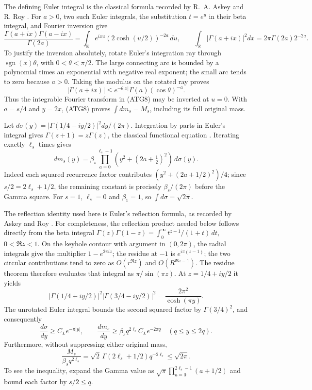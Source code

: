 \documentclass[11pt,a4paper]{article}
\begin{document}
The defining Euler integral is the classical formula recorded by
R.~A. Askey and R. Roy \cite[eq.~(5.2.1)]{human:dlmf5}.
For $a>0$, two such Euler integrals, the substitution $t=e^u$ in their
beta integral, and Fourier inversion give
\[
 \frac{\Gamma(a+ix)\Gamma(a-ix)}{\Gamma(2a)}
 =\int_{\mathbb R}e^{ixu}(2\cosh(u/2))^{-2a}\,du,
 \qquad
 \int_{\mathbb R}|\Gamma(a+ix)|^2dx
 =2\pi\Gamma(2a)2^{-2a}.
\tag{ATG8}
\]
To justify the inversion absolutely, rotate Euler's integration ray
through $\operatorname{sgn}(x)\theta$, with $0<\theta<\pi/2$.
The large connecting arc is bounded by a polynomial times an
exponential with negative real exponent; the small arc tends to zero
because $a>0$. Taking the modulus on the rotated ray proves
\[
 |\Gamma(a+ix)|\le e^{-\theta|x|}\Gamma(a)(\cos\theta)^{-a}.
\tag{ATG9}
\]
Thus the integrable Fourier transform in (ATG8) may be inverted at
$u=0$. With $a=s/4$ and $y=2x$, (ATG8) proves
$\int dm_s=M_s$, including its full original mass.

Let
$d\sigma(y)=|\Gamma(1/4+iy/2)|^2dy/(2\pi)$.
Integration by parts in Euler's integral gives
$\Gamma(z+1)=z\Gamma(z)$, the classical functional equation
\cite[eq.~(5.5.1)]{human:dlmf5}. Iterating exactly $\ell_s$ times gives
\[
 dm_s(y)=\beta_s\prod_{a=0}^{\ell_s-1}
                (y^2+(2a+\tfrac12)^2)\,d\sigma(y).
\tag{ATG10}
\]
Indeed each squared recurrence factor contributes
$(y^2+(2a+1/2)^2)/4$; since $s/2=2\ell_s+1/2$, the remaining
constant is precisely $\beta_s/(2\pi)$ before the Gamma square.
For $s=1$, $\ell_s=0$ and $\beta_1=1$, so
$\int d\sigma=\sqrt{2\pi}$.

The reflection identity used here is Euler's reflection formula,
as recorded by Askey and Roy \cite[eq.~(5.5.3)]{human:dlmf5}.
For completeness, the reflection product needed below follows
directly from the beta integral
$\Gamma(z)\Gamma(1-z)=\int_0^\infty t^{z-1}/(1+t)\,dt$,
$0<\Re z<1$. On the keyhole contour with argument in $(0,2\pi)$,
the radial integrals give the multiplier $1-e^{2\pi iz}$; the
residue at $-1$ is $e^{i\pi(z-1)}$; the two circular contributions
tend to zero as $O(r^{\Re z})$ and $O(R^{\Re z-1})$.
The residue theorem therefore evaluates that integral as
$\pi/\sin(\pi z)$. At $z=1/4+iy/2$ it yields
\[
 |\Gamma(1/4+iy/2)|^2|\Gamma(3/4-iy/2)|^2
       =\frac{2\pi^2}{\cosh(\pi y)}.
\tag{ATG11}
\]
The unrotated Euler integral bounds the second squared factor by
$\Gamma(3/4)^2$, and consequently
\[
 \frac{d\sigma}{dy}\ge C_Le^{-\pi|y|},\qquad
 \frac{dm_s}{dy}\ge\beta_s q^{2\ell_s}C_Le^{-2\pi q}
                 \quad(q\le y\le2q).
\tag{ATG12}
\]
Furthermore, without suppressing either original mass,
\[
 \frac{M_s}{\beta_s q^{2\ell_s}}
 =\sqrt2\,\Gamma(2\ell_s+1/2)q^{-2\ell_s}
 \le\sqrt{2\pi}.
\tag{ATG13}
\]
To see the inequality, expand the Gamma value as
$\sqrt\pi\prod_{a=0}^{2\ell_s-1}(a+1/2)$ and bound each factor
by $s/2\le q$.
\end{document}
